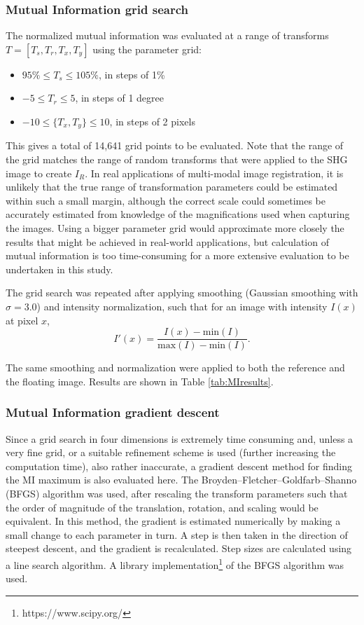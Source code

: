 \documentclass{report}
\begin{document}
\subsubsection{Mutual Information grid search}
The normalized mutual information was evaluated at a range of transforms $T = [T_s, T_r, T_x, T_y]$ using the parameter grid:
\begin{itemize}
    \item $95\% \leq T_s \leq 105\%$, in steps of 1\%
    \item $-5 \leq T_r \leq 5$, in steps of 1 degree
    \item $-10 \leq \{T_x, T_y\} \leq 10$, in steps of 2 pixels
\end{itemize}
This gives a total of 14,641 grid points to be evaluated. Note that the range of the grid matches the range of random transforms that were applied to the SHG image to create $I_R$. In real applications of multi-modal image registration, it is unlikely that the true range of transformation parameters could be estimated within such a small margin, although the correct scale could sometimes be accurately estimated from knowledge of the magnifications used when capturing the images. Using a bigger parameter grid would approximate more closely the results that might be achieved in real-world applications, but calculation of mutual information is too  time-consuming for a more extensive evaluation to be undertaken in this study.


The grid search was repeated after applying smoothing (Gaussian smoothing with $\sigma = 3.0$) and intensity normalization, such that for an image with intensity $I(x)$ at pixel $x$, 
\[
I'(x) = \frac{I(x)-\text{min}(I)}{\text{max}(I)-\text{min}(I)}.
\]

The same smoothing and normalization were applied to both the reference and the floating image. Results are shown in Table \ref{tab:MIresults}.

\subsubsection{Mutual Information gradient descent}
Since a grid search in four dimensions is extremely time consuming and, unless a very fine grid, or a suitable refinement scheme is used (further increasing the computation time), also rather inaccurate, a gradient descent method for finding the MI maximum is also evaluated here. The Broyden–Fletcher–Goldfarb–Shanno (BFGS) algorithm was used, after rescaling the transform parameters such that the order of magnitude of the translation, rotation, and scaling would be equivalent. In this method, the gradient is estimated numerically by making a small change to each parameter in turn. A step is then taken in the direction of steepest descent, and the gradient is recalculated. Step sizes are calculated using a line search algorithm. A library implementation\footnote{https://www.scipy.org/} of the BFGS algorithm was used.
\end{document}
